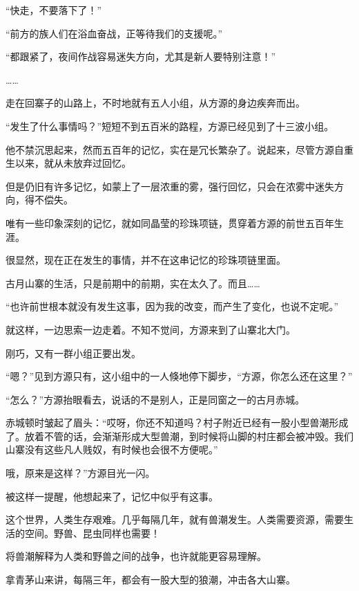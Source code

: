 
\begin{this_body}



“快走，不要落下了！”

“前方的族人们在浴血奋战，正等待我们的支援呢。”

“都跟紧了，夜间作战容易迷失方向，尤其是新人要特别注意！”

……

走在回寨子的山路上，不时地就有五人小组，从方源的身边疾奔而出。

“发生了什么事情吗？”短短不到五百米的路程，方源已经见到了十三波小组。

他不禁沉思起来，然而五百年的记忆，实在是冗长繁杂了。说起来，尽管方源自重生以来，就从未放弃过回忆。

但是仍旧有许多记忆，如蒙上了一层浓重的雾，强行回忆，只会在浓雾中迷失方向，得不偿失。

唯有一些印象深刻的记忆，就如同晶莹的珍珠项链，贯穿着方源的前世五百年生涯。

很显然，现在正在发生的事情，并不在这串记忆的珍珠项链里面。

古月山寨的生活，只是前期中的前期，实在太久了。而且……

“也许前世根本就没有发生这事，因为我的改变，而产生了变化，也说不定呢。”

就这样，一边思索一边走着。不知不觉间，方源来到了山寨北大门。

刚巧，又有一群小组正要出发。

“嗯？”见到方源只有，这小组中的一人倏地停下脚步，“方源，你怎么还在这里？”

“怎么？”方源抬眼看去，说话的不是别人，正是同窗之一的古月赤城。

赤城顿时皱起了眉头：“哎呀，你还不知道吗？村子附近已经有一股小型兽潮形成了。放着不管的话，会渐渐形成大型兽潮，到时候将山脚的村庄都会被冲毁。我们山寨没有这些凡人贱奴，有时候也会很不方便呢。”

哦，原来是这样？”方源目光一闪。

被这样一提醒，他想起来了，记忆中似乎有这事。

这个世界，人类生存艰难。几乎每隔几年，就有兽潮发生。人类需要资源，需要生活的空间。野兽、昆虫同样也需要！

将兽潮解释为人类和野兽之间的战争，也许就能更容易理解。

拿青茅山来讲，每隔三年，都会有一股大型的狼潮，冲击各大山寨。


\end{this_body}
